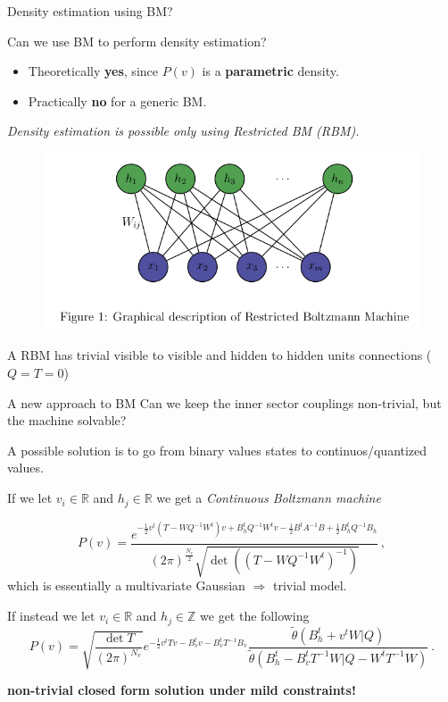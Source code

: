 \documentclass[10pt]{beamer}
\begin{document}
\begin{frame}{Density estimation using BM?}
    \begin{block}{Can we use BM to perform density estimation?}
        \begin{itemize}
            \pause
            \item Theoretically \textbf{yes}, since  $P(v)$ is a \textbf{parametric} density.
            \pause
            \item Practically \textbf{no} for a generic BM.
        \end{itemize}
     \end{block}
    \pause
    \emph{Density estimation is possible only using Restricted BM (RBM).}

    \begin{figure}
        \includegraphics[width= 0.7 \textwidth]{restricted.png}
    \end{figure}
    A RBM has trivial visible to visible and hidden to hidden units connections ($Q=T=0$) 
\end{frame}

\begin{frame}{A new approach to BM}
    Can we keep the inner sector couplings non-trivial, but the machine solvable?

    A possible solution is to go from binary values states to continuos/quantized values.

    If we let $v_i \in \mathbb{R}$ and $h_j \in \mathbb{R}$ we get a
    \emph{Continuous Boltzmann machine}

    \begin{equation*}
        P(v)= \frac{e^{-\frac{1}{2}v^t(T-W Q^{-1}W^t)v +B_h^t Q^{-1} W^t v  - \frac{1}{2}B^tA^{-1}B +\frac{1}{2}B^t_h Q^{-1} B_h  }  }{(2\pi )^{\frac{N_v}{2}} \sqrt{\det((T-W Q^{-1}W^t)^{-1})}  } \,,
    \end{equation*}
    which is essentially a multivariate Gaussian $\Rightarrow$ trivial model.

    If instead we let $v_i \in \mathbb{R}$ and $h_j \in \mathbb{Z}$ we get the following
    \begin{equation*}
        P(v) = \sqrt{\frac{\det T}{(2\pi)^{N_v}}} e^{- \frac{1}{2} v^t T v - B_v^t v - B_v^t T^{-1} B_v}
            \frac{\tilde{\theta}(B^t_h+v^t W \vert Q)}
            {\tilde{\theta}(B^t_h-B_v^t T^{-1} W \vert Q - W^t T^{-1} W)} \ .
    \end{equation*}
    \begin{center}
        \textbf{non-trivial closed form solution under mild constraints!}
    \end{center}

\end{frame}
\end{document}
